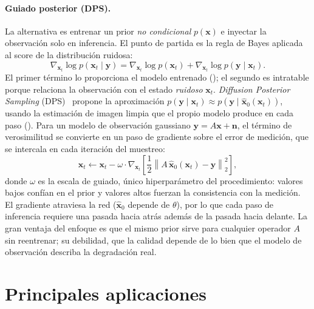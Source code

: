 \paragraph{Guiado posterior (DPS).}
La alternativa es entrenar un prior \emph{no condicional}
$p(\mathbf{x})$ e inyectar la observación solo en inferencia. El
punto de partida es la regla de Bayes aplicada al score de la
distribución ruidosa:
\begin{equation}
    \nabla_{\mathbf{x}_t} \log p(\mathbf{x}_t \mid \mathbf{y})
    = \nabla_{\mathbf{x}_t} \log p(\mathbf{x}_t)
    + \nabla_{\mathbf{x}_t} \log p(\mathbf{y} \mid \mathbf{x}_t).
    \label{eq:posterior-score}
\end{equation}
El primer término lo proporciona el modelo entrenado
(); el segundo es intratable porque relaciona la
observación con el estado \emph{ruidoso} $\mathbf{x}_t$.
\textit{Diffusion Posterior Sampling} (DPS)~\cite{chung2023dps}
propone la aproximación
$p(\mathbf{y} \mid \mathbf{x}_t) \approx
p(\mathbf{y} \mid \hat{\mathbf{x}}_0(\mathbf{x}_t))$, usando la
estimación de imagen limpia que el propio modelo produce en cada paso
(). Para un modelo de observación gaussiano
$\mathbf{y} = A\mathbf{x} + \mathbf{n}$, el término de verosimilitud
se convierte en un paso de gradiente sobre el error de medición, que
se intercala en cada iteración del muestreo:
\begin{equation}
    \mathbf{x}_t \leftarrow
        \mathbf{x}_t - \omega \cdot
        \nabla_{\mathbf{x}_t}
        \!\left[\frac{1}{2}
            \left\|A\,\hat{\mathbf{x}}_0(\mathbf{x}_t)
              - \mathbf{y}\right\|_2^2
        \right],
    \label{eq:dps-update}
\end{equation}
donde $\omega$ es la escala de guiado, único hiperparámetro del
procedimiento: valores bajos confían en el prior y valores altos
fuerzan la consistencia con la medición. El gradiente atraviesa la
red ($\hat{\mathbf{x}}_0$ depende de $\theta$), por lo que cada paso
de inferencia requiere una pasada hacia atrás además de la pasada
hacia delante. La gran ventaja del enfoque es que el mismo prior
sirve para cualquier operador $A$ sin reentrenar; su debilidad, que
la calidad depende de lo bien que el modelo de observación describa
la degradación real.

\section{Principales aplicaciones}
\label{sec:aplicaciones-difusion}

